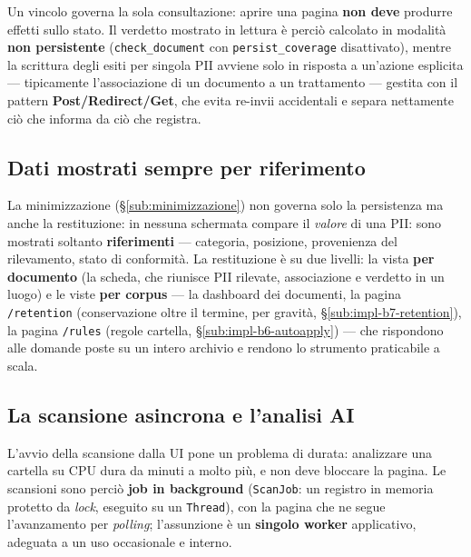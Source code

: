 Un vincolo governa la sola consultazione: aprire una pagina \textbf{non deve} produrre effetti sullo stato. Il verdetto mostrato in lettura è perciò calcolato in modalità \textbf{non persistente} (\texttt{check\_document} con \texttt{persist\_coverage} disattivato), mentre la scrittura degli esiti per singola PII avviene solo in risposta a un'azione esplicita --- tipicamente l'associazione di un documento a un trattamento --- gestita con il pattern \textbf{Post/Redirect/Get}, che evita re-invii accidentali e separa nettamente ciò che informa da ciò che registra.

\subsection{Dati mostrati sempre per riferimento}
\label{sub:impl-b8-viste}

La minimizzazione (§\ref{sub:minimizzazione}) non governa solo la persistenza ma anche la restituzione: in nessuna schermata compare il \emph{valore} di una PII: sono mostrati soltanto \textbf{riferimenti} --- categoria, posizione, provenienza del rilevamento, stato di conformità. La restituzione è su due livelli: la vista \textbf{per documento} (la scheda, che riunisce PII rilevate, associazione e verdetto in un luogo) e le viste \textbf{per corpus} --- la dashboard dei documenti, la pagina \texttt{/retention} (conservazione oltre il termine, per gravità, §\ref{sub:impl-b7-retention}), la pagina \texttt{/rules} (regole cartella, §\ref{sub:impl-b6-autoapply}) --- che rispondono alle domande poste su un intero archivio e rendono lo strumento praticabile a scala.

\subsection{La scansione asincrona e l'analisi AI}
\label{sub:impl-b8-scan}

L'avvio della scansione dalla UI pone un problema di durata: analizzare una cartella su CPU dura da minuti a molto più, e non deve bloccare la pagina. Le scansioni sono perciò \textbf{job in background} (\texttt{ScanJob}: un registro in memoria protetto da \emph{lock}, eseguito su un \texttt{Thread}), con la pagina che ne segue l'avanzamento per \emph{polling}; l'assunzione è un \textbf{singolo worker} applicativo, adeguata a un uso occasionale e interno.

